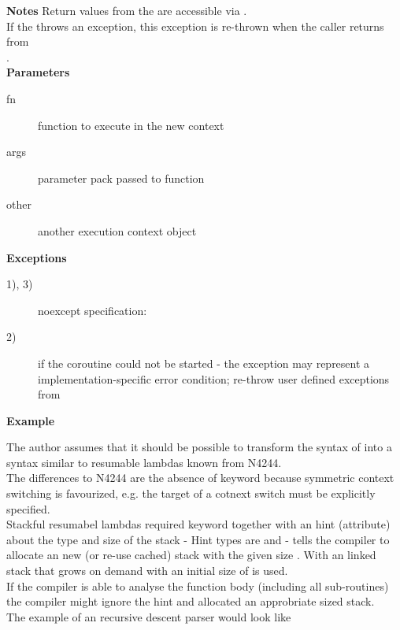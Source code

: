 {\bf Notes}
\newline
Return values from the \corofunction are accessible via \pullcoroget.\\
If the \corofunction throws an exception, this exception is re-thrown when the
caller returns from\\
\pullcoroop.\\

{\bf Parameters}
\begin{description}
    \item[fn]     function to execute in the new context
    \item[args]   parameter pack passed to function 
    \item[other]  another execution context object\\
\end{description}

{\bf Exceptions}
\begin{description}
    \item[1), 3)] noexcept specification: 
    \item[2)]  if the coroutine could not be started
                  - the exception may represent a implementation-specific error
                  condition; re-throw user defined exceptions from \corofunction\\
\end{description}

{\bf Example}

The author assumes that it should be possible to transform the syntax of \ectx
into a syntax similar to resumable lambdas known from N4244.\\
The differences to N4244 are the absence of keyword \yield because symmetric
context switching is favourized, e.g. the target of a cotnext switch must be
explicitly specified.\\
Stackful resumabel lambdas required keyword \resumable together with an hint
(attribute) about the type and size of the stack -
Hint types are  and  -  tells
the compiler to allocate an new (or re-use cached) stack with the given size
. With  an linked stack that grows on demand with an
initial size of  is used.\\
If the compiler is able to analyse the function body (including all
sub-routines) the compiler might ignore the hint and allocated an approbriate
sized stack.\\
\newline
The example of an recursive descent parser would look like
